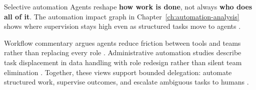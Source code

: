 \begin{insightbox}{Selective automation}
Agents reshape \textbf{how work is done}, not always \textbf{who does all of it}. The
automation impact graph in Chapter~\ref{ch:automation-analysis} shows where supervision
stays high even as structured tasks move to agents \cite{arxiv2506workagents}.
\end{insightbox}

Workflow commentary argues agents reduce friction between tools and teams rather than
replacing every role \cite{mediumworkflowagents}. Administrative automation studies
describe task displacement in data handling with role redesign rather than silent team
elimination \cite{recomaijobroles}. Together, these views support bounded delegation:
automate structured work, supervise outcomes, and escalate ambiguous tasks to humans
\cite{redditcomplextasks}.
